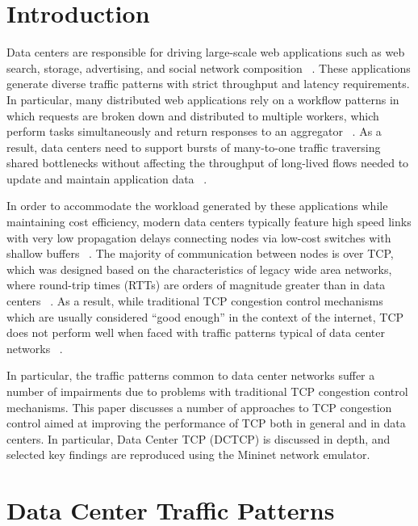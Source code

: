 \section{Introduction}

Data centers are responsible for driving large-scale web applications such as web search, storage, advertising, and social network composition ~\cite{chen_understanding_2009, alizadeh_data_2010}. These applications generate diverse traffic patterns with strict throughput and latency requirements. In particular, many distributed web applications rely on a workflow patterns in which requests are broken down and distributed to multiple workers, which perform tasks simultaneously and return responses to an aggregator ~\cite{chen_understanding_2009, alizadeh_data_2010}. As a result, data centers need to support bursts of many-to-one traffic traversing shared bottlenecks without affecting the throughput of long-lived flows needed to update and maintain application data ~\cite{alizadeh_data_2010}.

In order to accommodate the workload generated by these applications while maintaining cost efficiency, modern data centers typically feature high speed links with very low propagation delays connecting nodes via low-cost switches with shallow buffers ~\cite{chen_understanding_2009, hamilton_designing_2007, alizadeh_data_2010}. The majority of communication between nodes is over TCP, which was designed based on the characteristics of legacy wide area networks, where round-trip times (RTTs) are orders of magnitude greater than in data centers ~\cite{chen_understanding_2009}. As a result, while traditional TCP congestion control mechanisms which are usually considered ``good enough'' in the context of the internet, TCP does not perform well when faced with traffic patterns typical of data center networks ~\cite{chen_understanding_2009, phanishayee_measurement_2008}. 

In particular, the traffic patterns common to data center networks suffer a number of impairments due to problems with traditional TCP congestion control mechanisms. This paper discusses a number of approaches to TCP congestion control aimed at improving the performance of TCP both in general and in data centers. In particular, Data Center TCP (DCTCP) is discussed in depth, and selected key findings are reproduced using the Mininet network emulator.

\section{Data Center Traffic Patterns}

